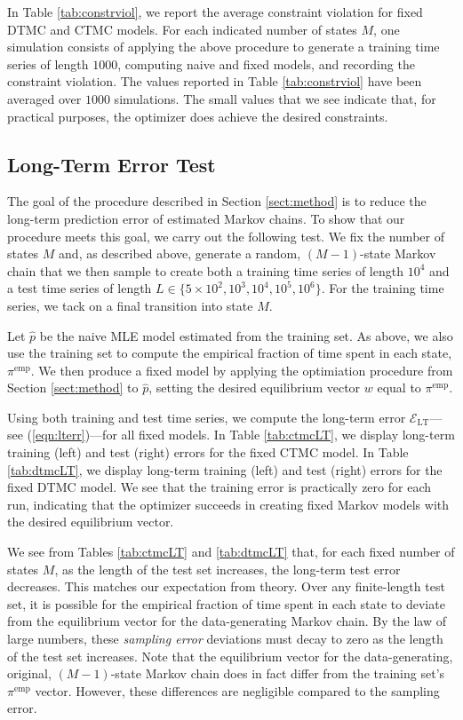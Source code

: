 \documentclass[review,letterpaper,11pt]{elsarticle}
\begin{document}
In Table \ref{tab:constrviol}, we report the average constraint violation for fixed DTMC and CTMC models.  For each indicated number of states $M$, one simulation consists of applying the above procedure to generate a training time series of length $1000$, computing naive and fixed models, and recording the constraint violation.  The values reported in Table \ref{tab:constrviol} have been averaged over $1000$ simulations.  The small values that we see indicate that, for practical purposes, the optimizer does achieve the desired constraints.

\subsection{Long-Term Error Test}
The goal of the procedure described in Section \ref{sect:method} is to reduce the long-term prediction error of estimated Markov chains.  To show that our procedure meets this goal, we carry out the following test.  We fix the number of states $M$ and, as described above, generate a random, $(M-1)$-state Markov chain that we then sample to create both a training time series of length $10^4$ and a test time series of length $L \in \{5 \times 10^2, 10^3, 10^4, 10^5, 10^6\}$.  For the training time series, we tack on a final transition into state $M$.  

Let $\widehat{p}$ be the naive MLE model estimated from the training set.  As above, we also use the training set to compute the empirical fraction of time spent in each state, $\pi^\text{emp}$.  We then produce a fixed model by applying the optimiation procedure from Section \ref{sect:method} to $\widehat{p}$, setting the desired equilibrium vector $w$ equal to $\pi^\text{emp}$.

Using both training and test time series, we compute the long-term error $\mathcal{E}_\text{LT}$---see (\ref{eqn:lterr})---for all fixed models.  In Table \ref{tab:ctmcLT}, we display long-term training (left) and test (right) errors for the fixed CTMC model.  In Table \ref{tab:dtmcLT}, we display long-term training (left) and test (right) errors for the fixed DTMC model.  We see that the training error is practically zero for each run, indicating that the optimizer succeeds in creating fixed Markov models with the desired equilibrium vector.  

We see from Tables \ref{tab:ctmcLT} and \ref{tab:dtmcLT} that, for each fixed number of states $M$, as the length of the test set increases, the long-term test error decreases.  This matches our expectation from theory.  Over any finite-length test set, it is possible for the empirical fraction of time spent in each state to deviate from the equilibrium vector for the data-generating Markov chain.  By the law of large numbers, these \emph{sampling error} deviations must decay to zero as the length of the test set increases.  Note that the equilibrium vector for the data-generating, original, $(M-1)$-state Markov chain does in fact differ from the training set's $\pi^\text{emp}$ vector.  However, these differences are negligible compared to the sampling error.
\end{document}
